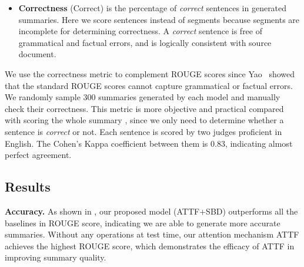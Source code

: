 \begin{itemize}
\item \textbf{Correctness} (Correct) is the percentage of
\textit{correct} sentences in generated summaries.
Here we score sentences instead of segments because segments are incomplete 
for determining correctness.
A \textit{correct} sentence is free of grammatical and 
factual errors, 
and is logically consistent with source document.
\end{itemize}

We use the correctness metric to complement ROUGE scores 
since Yao~ showed that the standard 
ROUGE scores cannot capture grammatical or factual errors. 
We randomly sample $300$ summaries generated by each model
and manually check their correctness. 
This metric is more objective and practical compared with
scoring the whole summary \cite{D18-1205}, since we only need 
to determine whether a sentence is {\em correct} or not.
Each sentence is scored by two judges proficient in English. 
The Cohen's Kappa coefficient between them is $0.83$, 
indicating almost perfect agreement.

\subsection{Results}
\label{sec:result}

\textbf{Accuracy.} As shown in , 
our proposed model (ATTF+SBD)
outperforms all the baselines in ROUGE score, indicating we are able to generate more
accurate summaries. Without any operations at test time, our attention
mechanism ATTF achieves the highest ROUGE score, which demonstrates 
the efficacy of ATTF in improving summary quality.

